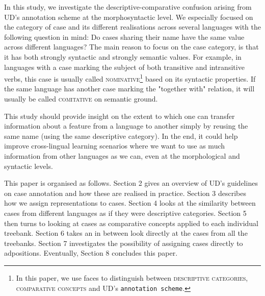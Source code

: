 \documentclass[11pt]{article}
\newcommand{\scsf}[1]{\textsc{\textsf{#1}}} %
\begin{document}
In this study, we investigate the descriptive-comparative confusion arising from UD's annotation scheme at the morphosyntactic level.
We especially focused on the category of case and its different realisations across several languages with the following question in mind: 
Do cases sharing their name have the same value across different languages?
The main reason to focus on the case category, is that it has both strongly syntactic and strongly semantic values.
For example, in languages with a case marking the subject of both transitive and intransitive verbs, this case is usually called \scsf{nominative}\footnote{In this paper, we use faces to distinguish between \scsf{descriptive categories}, \textsc{comparative concepts} and UD's \texttt{annotation scheme}.} based on its syntactic properties. 
If the same language has another case marking the "together with" relation, it will usually be called \scsf{comitative} on semantic ground.

This study should provide insight on the extent to which one can transfer information about a feature from a language to another simply by reusing the same name (using the same descriptive category).
In the end, it could help improve cross-lingual learning scenarios where we want to use as much information from other languages as we can, even at the morphological and syntactic levels. 



This paper is organised as follows.
Section 2 gives an overview of UD's guidelines on case annotation and how these are realised in practice.
Section 3 describes how we assign representations to cases.
Section 4 looks at the similarity between cases from different languages as if they were descriptive categories.
Section 5 then turns to looking at cases as comparative concepts applied to each individual treebank.
Section 6 takes an in between look directly at the cases from all the treebanks.
Section 7 investigates the possibility of assigning cases directly to adpositions.
Eventually, Section 8 concludes this paper.
\end{document}
